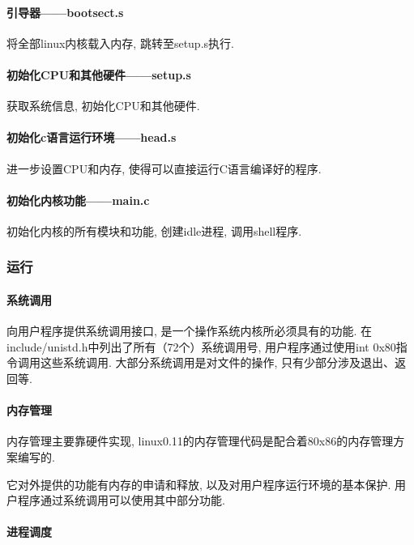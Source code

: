 \documentclass{ctexart}
\begin{document}
\paragraph{引导器——bootsect.s}

将全部linux内核载入内存, 跳转至setup.s执行.

\paragraph{初始化CPU和其他硬件——setup.s}

获取系统信息, 初始化CPU和其他硬件. 

\paragraph{初始化c语言运行环境——head.s}

进一步设置CPU和内存, 使得可以直接运行C语言编译好的程序. 

\paragraph{初始化内核功能——main.c}

初始化内核的所有模块和功能, 创建idle进程, 调用shell程序. 

\subsubsection{运行}

\paragraph{系统调用}

向用户程序提供系统调用接口, 是一个操作系统内核所必须具有的功能. 在include/unistd.h中列出了所有（72个）系统调用号, 用户程序通过使用int 0x80指令调用这些系统调用. 大部分系统调用是对文件的操作, 只有少部分涉及退出、返回等. 

\paragraph{内存管理}

内存管理主要靠硬件实现, linux0.11的内存管理代码是配合着80x86的内存管理方案编写的. 

它对外提供的功能有内存的申请和释放, 以及对用户程序运行环境的基本保护. 用户程序通过系统调用可以使用其中部分功能. 

\paragraph{进程调度}
\end{document}
